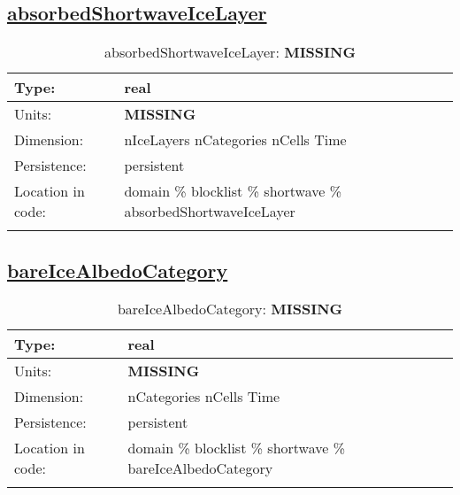 \subsection[absorbedShortwaveIceLayer]{\hyperref[sec:var_tab_shortwave]{absorbedShortwaveIceLayer}}
\label{subsec:var_sec_shortwave_absorbedShortwaveIceLayer}
\begin{center}
\begin{longtable}{| p{2.0in} | p{4.0in} |}
        \hline 
        Type: & real \\
        \hline 
        Units: & {\bf \color{red} MISSING} \\
        \hline 
        Dimension: & nIceLayers nCategories nCells Time \\
        \hline 
        Persistence: & persistent \\
        \hline 
         Location in code: & domain \% blocklist \% shortwave \% absorbedShortwaveIceLayer \\
         \hline 
    \caption{absorbedShortwaveIceLayer: {\bf \color{red} MISSING}}
\end{longtable}
\end{center}
\subsection[bareIceAlbedoCategory]{\hyperref[sec:var_tab_shortwave]{bareIceAlbedoCategory}}
\label{subsec:var_sec_shortwave_bareIceAlbedoCategory}
\begin{center}
\begin{longtable}{| p{2.0in} | p{4.0in} |}
        \hline 
        Type: & real \\
        \hline 
        Units: & {\bf \color{red} MISSING} \\
        \hline 
        Dimension: & nCategories nCells Time \\
        \hline 
        Persistence: & persistent \\
        \hline 
         Location in code: & domain \% blocklist \% shortwave \% bareIceAlbedoCategory \\
         \hline 
    \caption{bareIceAlbedoCategory: {\bf \color{red} MISSING}}
\end{longtable}
\end{center}
